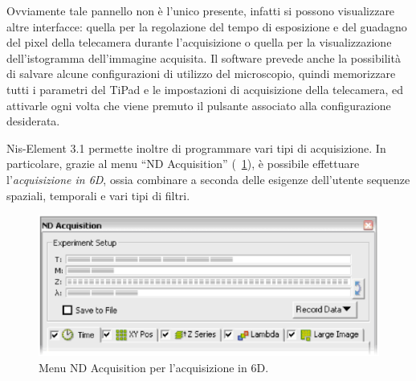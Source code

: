 Ovviamente tale pannello non è l'unico presente, infatti si possono visualizzare altre interfacce: quella per la regolazione del tempo di esposizione e del guadagno del pixel della telecamera durante l'acquisizione o quella per la visualizzazione dell'istogramma dell'immagine acquisita.
Il software prevede anche la possibilità di salvare alcune configurazioni di utilizzo del microscopio, quindi memorizzare tutti i parametri del TiPad e le impostazioni di acquisizione della telecamera, ed attivarle ogni volta che viene premuto il pulsante associato alla configurazione desiderata. 

Nis-Element 3.1 permette inoltre di programmare vari tipi di acquisizione. 
In particolare, grazie al menu ``ND Acquisition'' (\figurename~\ref{fig:6D}), è possibile effettuare l'\textit{acquisizione in 6D}, ossia combinare a seconda delle esigenze dell'utente sequenze spaziali, temporali e vari tipi di filtri. 

\begin{figure}
 \centering
 \includegraphics[scale=.70]{img/CAP26D.png}
 \caption{\small{Menu ND Acquisition per l'acquisizione in 6D.}}
 \label{fig:6D}
\end{figure}

